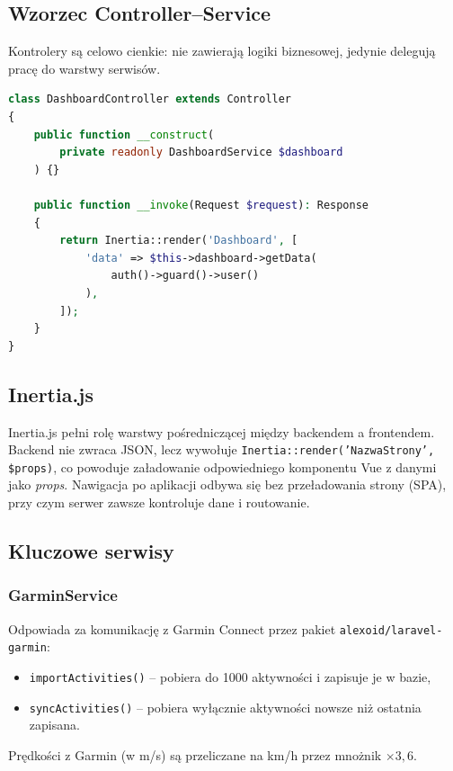 \documentclass[12pt,a4paper]{report}
\begin{document}
\subsection{Wzorzec Controller--Service}

Kontrolery są celowo cienkie: nie zawierają logiki biznesowej, jedynie delegują pracę do warstwy serwisów.

\begin{lstlisting}[language=PHP, caption=Przykładowy kontroler delegujący do serwisu]
class DashboardController extends Controller
{
    public function __construct(
        private readonly DashboardService $dashboard
    ) {}

    public function __invoke(Request $request): Response
    {
        return Inertia::render('Dashboard', [
            'data' => $this->dashboard->getData(
                auth()->guard()->user()
            ),
        ]);
    }
}
\end{lstlisting}

\subsection{Inertia.js}

Inertia.js pełni rolę warstwy pośredniczącej między backendem a frontendem. Backend nie zwraca JSON, lecz wywołuje \texttt{Inertia::render('NazwaStrony', \$props)}, co powoduje załadowanie odpowiedniego komponentu Vue z danymi jako \textit{props}. Nawigacja po aplikacji odbywa się bez przeładowania strony (SPA), przy czym serwer zawsze kontroluje dane i routowanie.

\subsection{Kluczowe serwisy}

\subsubsection{GarminService}

Odpowiada za komunikację z Garmin Connect przez pakiet \texttt{alexoid/laravel-garmin}:
\begin{itemize}[noitemsep]
    \item \texttt{importActivities()} -- pobiera do 1000 aktywności i zapisuje je w bazie,
    \item \texttt{syncActivities()} -- pobiera wyłącznie aktywności nowsze niż ostatnia zapisana.
\end{itemize}
Prędkości z Garmin (w m/s) są przeliczane na km/h przez mnożnik $\times 3{,}6$.
\end{document}
